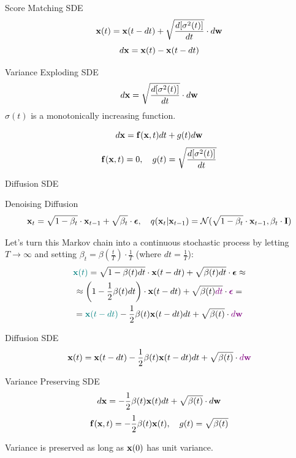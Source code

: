 \documentclass{beamer}
\renewcommand{\eqpause}{}
\renewcommand{\nextonslide}[1]{#1}
\begin{document}
\begin{frame}{Score Matching SDE}
	\vspace{-0.3cm}
	\[
		\mathbf{x}(t) = \mathbf{x}(t - dt) + \sqrt{\frac{ d [\sigma^2(t)]}{dt}} \cdot d \mathbf{w}
	\]
	\[
		d\mathbf{x} = \mathbf{x}(t) - \mathbf{x}(t - dt)
	\]
    \eqpause
	\vspace{-0.5cm}
	\begin{block}{Variance Exploding SDE}
		\vspace{-0.3cm}
		\[
			d \mathbf{x} = \sqrt{\frac{ d [\sigma^2(t)]}{dt}} \cdot d \mathbf{w}
		\]
		$\sigma(t)$ is a monotonically increasing function.
	\end{block}
    \eqpause
	\vspace{-0.3cm}
	\[
		d\mathbf{x} = \mathbf{f}(\mathbf{x}, t) dt + g(t) d \mathbf{w}
	\]
	\[
		\mathbf{f}(\mathbf{x}, t) = 0, \quad g(t) = \sqrt{\frac{ d [\sigma^2(t)]}{dt}} 
	\]
\end{frame}
\begin{frame}{Diffusion SDE}
	\begin{block}{Denoising Diffusion}
		\vspace{-0.5cm}
		\[
			\mathbf{x}_t = \sqrt{1 - \beta_t} \cdot \mathbf{x}_{t - 1} + \sqrt{\beta_t} \cdot \boldsymbol{\epsilon}, \quad q(\mathbf{x}_t | \mathbf{x}_{t-1}) = \mathcal{N}(\sqrt{1 - \beta_t} \cdot \mathbf{x}_{t-1}, \beta_t \cdot \mathbf{I})
		\]
		\vspace{-0.5cm}
	\end{block}
    \eqpause
	Let's turn this Markov chain into a continuous stochastic process by letting $T \rightarrow \infty$ and setting $\beta_t = \beta(\frac{t}{T}) \cdot \frac{1}{T}$ (where $dt = \frac{1}{T}$):
	\begin{multline*}
		{\color{teal}\bx(t)} = \sqrt{1 - \beta(t) dt} \cdot \bx(t - dt) + \sqrt{\beta(t)dt} \cdot \bepsilon 
		\nextonslide{\approx \\ \approx \left(1 - \frac{1}{2} \beta(t) dt\right) \cdot \bx(t - dt) + \sqrt{\beta(t){\color{violet}dt}} \cdot {\color{violet}\bepsilon}}
		\nextonslide{= \\ = {\color{teal}\bx(t - dt)} - \frac{1}{2} \beta(t) \bx(t - dt) dt  + \sqrt{\beta(t)} \cdot {\color{violet}d \bw}}
	\end{multline*}
\end{frame}
\begin{frame}{Diffusion SDE}
	\[
		\mathbf{x}(t) = \mathbf{x}(t - dt) - \frac{1}{2} \beta(t) \mathbf{x}(t - dt) dt  + \sqrt{\beta(t)} \cdot {\color{violet}d \mathbf{w}}
	\]
	\eqpause
	\begin{block}{Variance Preserving SDE}
		\vspace{-0.3cm}
		\[
			d \mathbf{x} = - \frac{1}{2} \beta(t) \mathbf{x}(t) dt + \sqrt{\beta(t)} \cdot d \mathbf{w}
		\]
		\[
			\mathbf{f}(\mathbf{x}, t) = - \frac{1}{2} \beta(t) \mathbf{x}(t) , \quad g(t) = \sqrt{\beta(t)} 
		\]
	\end{block}
	Variance is preserved as long as $\mathbf{x}(0)$ has unit variance.
\end{frame}
\end{document}
